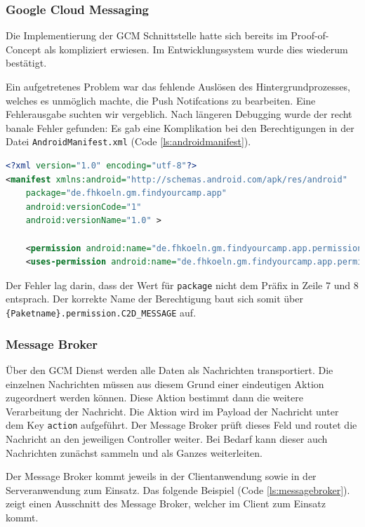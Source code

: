 \subsubsection{Google Cloud Messaging}

Die Implementierung der GCM Schnittstelle hatte sich bereits im Proof-of-Concept als kompliziert erwiesen. Im Entwicklungssystem wurde dies wiederum bestätigt.

Ein aufgetretenes Problem war das fehlende Auslösen des Hintergrundprozesses, welches es unmöglich machte, die Push Notifcations zu bearbeiten. Eine Fehlerausgabe suchten wir vergeblich. Nach längeren Debugging wurde der recht banale Fehler gefunden: Es gab eine Komplikation bei den Berechtigungen in der Datei \texttt{AndroidManifest.xml} (Code \ref{ls:androidmanifest}).

\begin{lstlisting}[label=ls:androidmanifest,caption=Auszug aus der AndroidManifest.xml,language=xml]
<?xml version="1.0" encoding="utf-8"?>
<manifest xmlns:android="http://schemas.android.com/apk/res/android"
    package="de.fhkoeln.gm.findyourcamp.app"
    android:versionCode="1"
    android:versionName="1.0" >

    <permission android:name="de.fhkoeln.gm.findyourcamp.app.permission.C2D_MESSAGE" android:protectionLevel="signature" />
    <uses-permission android:name="de.fhkoeln.gm.findyourcamp.app.permission.C2D_MESSAGE" />
\end{lstlisting}

Der Fehler lag darin, dass der Wert für \texttt{package} nicht dem Präfix in Zeile 7 und 8 entsprach. Der korrekte Name der Berechtigung baut sich somit über \texttt{\{Paketname\}.permission.C2D\_MESSAGE} auf.


\subsubsection{Message Broker}

Über den GCM Dienst werden alle Daten als Nachrichten transportiert. Die einzelnen Nachrichten müssen aus diesem Grund einer eindeutigen Aktion zugeordnert werden können. Diese Aktion bestimmt dann die weitere Verarbeitung der Nachricht. Die Aktion wird im Payload der Nachricht unter dem Key \texttt{action} aufgeführt. Der Message Broker prüft dieses Feld und routet die Nachricht an den jeweiligen Controller weiter. Bei Bedarf kann dieser auch Nachrichten zunächst sammeln und als Ganzes weiterleiten.

Der Message Broker kommt jeweils in der Clientanwendung sowie in der Serveranwendung zum Einsatz. Das folgende Beispiel (Code \ref{ls:messagebroker}). zeigt einen Ausschnitt des Message Broker, welcher im Client zum Einsatz kommt.

